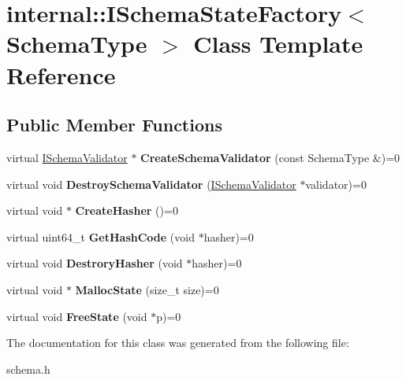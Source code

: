 \hypertarget{a00182}{}\section{internal\+:\+:I\+Schema\+State\+Factory$<$ Schema\+Type $>$ Class Template Reference}
\label{a00182}
\subsection*{Public Member Functions}
\begin{DoxyCompactItemize}
\item 
virtual \hyperlink{a00183}{I\+Schema\+Validator} $\ast$ {\bfseries Create\+Schema\+Validator} (const Schema\+Type \&)=0\hypertarget{a00182_ae8c98fcff6a057b4fcd9018fc14551a8}{}\label{a00182_ae8c98fcff6a057b4fcd9018fc14551a8}

\item 
virtual void {\bfseries Destroy\+Schema\+Validator} (\hyperlink{a00183}{I\+Schema\+Validator} $\ast$validator)=0\hypertarget{a00182_a112cbf154077050bc30ffe670032442c}{}\label{a00182_a112cbf154077050bc30ffe670032442c}

\item 
virtual void $\ast$ {\bfseries Create\+Hasher} ()=0\hypertarget{a00182_a4ac37b9d3e9526004c82692473f978f4}{}\label{a00182_a4ac37b9d3e9526004c82692473f978f4}

\item 
virtual uint64\+\_\+t {\bfseries Get\+Hash\+Code} (void $\ast$hasher)=0\hypertarget{a00182_addfcf00963cc777edf642b204f07c8d6}{}\label{a00182_addfcf00963cc777edf642b204f07c8d6}

\item 
virtual void {\bfseries Destrory\+Hasher} (void $\ast$hasher)=0\hypertarget{a00182_a70b8d88180d2e6993105b17f19101635}{}\label{a00182_a70b8d88180d2e6993105b17f19101635}

\item 
virtual void $\ast$ {\bfseries Malloc\+State} (size\+\_\+t size)=0\hypertarget{a00182_ada92ebf8e9ef994f7e20a0f7f9750519}{}\label{a00182_ada92ebf8e9ef994f7e20a0f7f9750519}

\item 
virtual void {\bfseries Free\+State} (void $\ast$p)=0\hypertarget{a00182_a27bd2138940cac3c330dd8399c49b22b}{}\label{a00182_a27bd2138940cac3c330dd8399c49b22b}

\end{DoxyCompactItemize}


The documentation for this class was generated from the following file\+:\begin{DoxyCompactItemize}
\item 
schema.\+h\end{DoxyCompactItemize}
